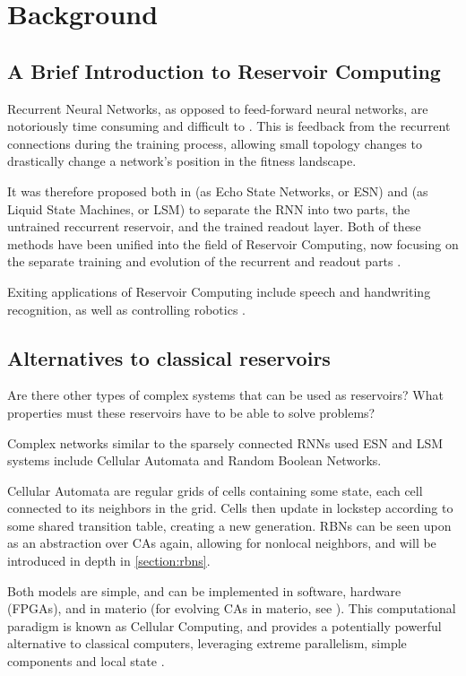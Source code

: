 \chapter{Background}
\label{chapter:background}

\section{A Brief Introduction to Reservoir Computing}

Recurrent Neural Networks, as opposed to feed-forward neural networks,
are notoriously time consuming and difficult to .
This is  feedback from the recurrent connections during the training process,
allowing small topology changes to drastically change a network's position in the fitness landscape.

It was therefore proposed both in \cite{jaeger2002adaptive} (as Echo State Networks, or ESN)
and \cite{natschlager2002liquid} (as Liquid State Machines, or LSM) to separate the RNN into two parts,
the untrained reccurrent reservoir, and the trained readout layer.
Both of these methods have been unified into the field of Reservoir Computing,
now focusing on the separate training and evolution of the recurrent and readout parts \cite{lukovsevivcius2012reservoir}.

Exiting applications of Reservoir Computing include speech and handwriting recognition,
as well as controlling robotics \cite{lukovsevivcius2012reservoir}.

\section{Alternatives to classical reservoirs}

Are there other types of complex systems that can be used as reservoirs?
What properties must these reservoirs have to be able to solve problems?

Complex networks similar to the sparsely connected RNNs used  ESN and LSM systems include Cellular Automata and Random Boolean Networks.

Cellular Automata are regular grids of cells containing some state,
each cell connected to its neighbors in the grid.
Cells then update in lockstep according to some shared transition table,
creating a new generation.
RBNs can be seen upon as an abstraction over CAs again,
allowing for nonlocal neighbors, and will be introduced in depth in \ref{section:rbns}.

Both models are simple, and can be implemented in software,
hardware (FPGAs), and in materio \cite{miller2002evolution}
(for evolving CAs in materio, see \cite{farstad2015evolving}).
This computational paradigm is known as Cellular Computing,
and provides a potentially powerful alternative to classical computers,
leveraging extreme parallelism, simple components and local state \cite{sipper1999emergence}.

